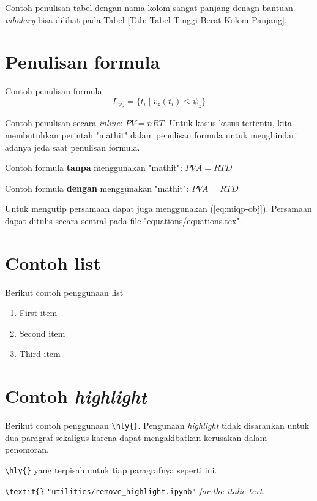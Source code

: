 Contoh penulisan tabel dengan nama kolom sangat panjang denagn bantuan \textit{tabulary} bisa dilihat pada Tabel \ref{Tab: Tabel Tinggi Berat Kolom Panjang}.

\section{Penulisan formula}
Contoh penulisan formula
\begin{equation}
L_{\psi_z} = \{ t_i \mid v_z(t_i) \le \psi_z \}
\end{equation}

Contoh penulisan secara \textit{inline}: $\mathit{PV = nRT}$. Untuk kasus-kasus tertentu, kita membutuhkan perintah "mathit" dalam penulisan formula untuk menghindari adanya jeda saat penulisan formula.

Contoh formula \textbf{tanpa} menggunakan "mathit": $PVA = RTD$

Contoh formula \textbf{dengan} menggunakan "mathit": $\mathit{PVA = RTD}$

Untuk mengutip persamaan dapat juga menggunakan (\ref{eq:miqp-obj}). Persamaan dapat ditulis secara sentral pada file "equations/equations.tex".


\section{Contoh list}
Berikut contoh penggunaan list
\begin{enumerate}
	\item First item
	\item Second item
	\item Third item
\end{enumerate}

\section{Contoh \textit{highlight}}
Berikut contoh penggunaan  \verb|\hly{}|. Pengunaan \textit{highlight} tidak disarankan untuk dua paragraf sekaligus karena dapat mengakibatkan kerusakan dalam penomoran.

 \verb|\hly{}| yang terpisah untuk tiap paragrafnya seperti ini.

 \verb|\textit{}|  \verb|"utilities/remove_highlight.ipynb"|  \textit{for the italic text} 
